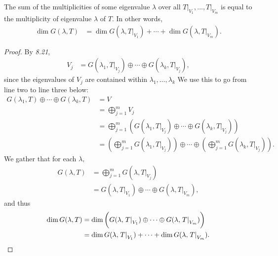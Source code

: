 \documentclass{amsart}
\newcommand{\restrict}[2]{\left.#1\right|_{#2}}
\begin{document}
\begin{claim*}
The sum of the multiplicities of some eigenvalue $\lambda$ over all
$\restrict{T}{V_1},\dots,\restrict{T}{V_m}$ is equal to the
multiplicity of eigenvalue $\lambda$ of $T.$ In other words,
\begin{align*}
    \dim G(\lambda,T)
            &= \dim G(\lambda,\restrict{T}{V_1})
            +\cdots+
            \dim G(\lambda,\restrict{T}{V_m}).
\end{align*}

\end{claim*}
\begin{proof}
By \textit{8.21},
\begin{align*}
    V_j &= G(\lambda_1,\restrict{T}{V_j})\oplus\cdots\oplus G(\lambda_k,
    \restrict{T}{V_j}),
\end{align*}
since the eigenvalues of $V_j$ are contained within
$\lambda_1,\dots,\lambda_k$ We use this to go from line
two to line three below:
\begin{align*}
    G(\lambda_1,T)\oplus\cdots\oplus G(\lambda_k,T)
      &= V \\
      &= \bigoplus_{j=1}^m{V_j} \\
      &= \bigoplus_{j=1}^m{\left(
          G(\lambda_1,\restrict{T}{V_j})\oplus\cdots\oplus G(\lambda_k,
    \restrict{T}{V_j})\right)} \\
      &= \left(\bigoplus_{j=1}^{m}G(\lambda_1,\restrict{T}{V_j})\right)
      \oplus\cdots\oplus
      \left(\bigoplus_{j=1}^{m}G(\lambda_k,\restrict{T}{V_j})\right).
\end{align*}
We gather that for each $\lambda,$
\begin{align*}
    G(\lambda,T) &= \bigoplus_{j=1}^m G(\lambda,\restrict{T}{V_j}) \\
                   &= G(\lambda,\restrict{T}{V_1})\oplus
                   \cdots\oplus G(\lambda,\restrict{T}{V_m}),
\end{align*}
and thus
\begin{align*}
    \dim G(\lambda,T) &= \dim\bigg(
        G(\lambda,\restrict{T}{V_1})
        \oplus\cdots\oplus G(\lambda,\restrict{T}{V_m})
    \bigg)\\
                        &= \dim G(\lambda,\restrict{T}{V_1})
                        +\cdots+
                        \dim G(\lambda,\restrict{T}{V_m}).\qedhere
\end{align*}
\end{proof}

\vspace{0.5in}
\end{document}
